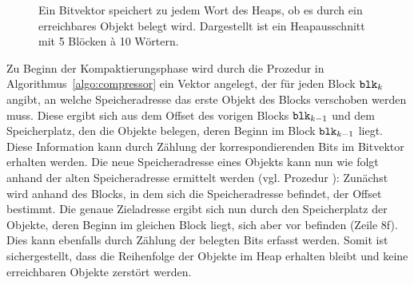 \begin{figure}[h]
	\centering
	
	\caption[Bitvektor]{Ein Bitvektor speichert zu jedem Wort des Heaps, ob es durch ein erreichbares Objekt belegt wird. Dargestellt ist ein Heapausschnitt mit 5 Blöcken à 10 Wörtern.}
	\label{fig:bitvector}
\end{figure}

Zu Beginn der Kompaktierungsphase wird durch die Prozedur  in Algorithmus~\ref{algo:compressor} ein Vektor  angelegt, der für jeden Block $\texttt{blk}_k$ angibt, an welche Speicheradresse das erste Objekt des Blocks verschoben werden muss.
Diese ergibt sich aus dem Offset des vorigen Blocks $\texttt{blk}_{k-1}$ und dem Speicherplatz, den die Objekte belegen, deren Beginn im Block $\texttt{blk}_{k-1}$ liegt.
Diese Information kann durch Zählung der korrespondierenden Bits im Bitvektor erhalten werden.
Die neue Speicheradresse eines Objekts kann nun wie folgt anhand der alten Speicheradresse  ermittelt werden (vgl. Prozedur ):
Zunächst wird anhand des Blocks, in dem sich die Speicheradresse befindet, der Offset bestimmt.
Die genaue Zieladresse ergibt sich nun durch den Speicherplatz der Objekte, deren Beginn im gleichen Block liegt, sich aber vor  befinden (Zeile 8f).
Dies kann ebenfalls durch Zählung der belegten Bits erfasst werden.
Somit ist sichergestellt, dass die Reihenfolge der Objekte im Heap erhalten bleibt und keine erreichbaren Objekte zerstört werden.

